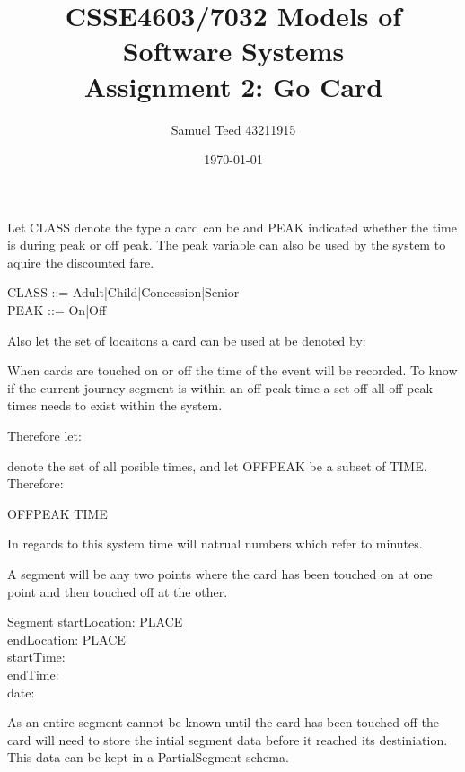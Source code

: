 \documentclass{article}
\begin{document}
\title{\bf CSSE4603/7032 Models of Software Systems\\[1ex] 
Assignment 2: Go Card}
\author{Samuel Teed 43211915}
\date{\today}
\maketitle

Let CLASS denote the type a card can be and PEAK indicated 
whether the time is during peak or off peak. The peak variable can also be used
by the system to aquire the discounted fare.

\begin{zed}
CLASS ::= Adult|Child|Concession|Senior\\
PEAK ::= On|Off
\end{zed}


Also let the set of locaitons a card can be used at be denoted by:
\begin{zed} 
[PLACE] 
\end{zed}

When cards are touched on or off the time of the event will be recorded. To know
if the current journey segment is within an off peak time a set off all off peak
times needs to exist within the system. 

Therefore let:
\begin{zed} 
[TIME] 
\end{zed}
denote the set of all posible times, and let OFFPEAK be a subset of TIME.
Therefore:
\begin{zed}
OFFPEAK \subseteq TIME
\end{zed}
In regards to this system time will natrual numbers which refer to minutes.


A segment will be any two points where the card has been touched on at one point and then touched off at the other.

\begin{schema}{Segment}
startLocation: PLACE\\
endLocation: PLACE\\
startTime: \nat\\
endTime: \nat\\
date: \nat
\end{schema}

As an entire segment cannot be known until the card has been touched off the card will need to store the intial segment 
data before it reached its destiniation. This data can be kept in a PartialSegment schema.
\end{document}
